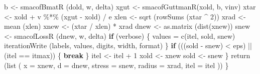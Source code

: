 \documentclass[
  12pt,
]{book}
\newenvironment{Shaded}{\begin{snugshade}}{\end{snugshade}}
\newcommand{\AttributeTok}[1]{\textcolor[rgb]{0.77,0.63,0.00}{#1}}
\newcommand{\ControlFlowTok}[1]{\textcolor[rgb]{0.13,0.29,0.53}{\textbf{#1}}}
\newcommand{\DecValTok}[1]{\textcolor[rgb]{0.00,0.00,0.81}{#1}}
\newcommand{\FunctionTok}[1]{\textcolor[rgb]{0.00,0.00,0.00}{#1}}
\newcommand{\NormalTok}[1]{#1}
\newcommand{\OtherTok}[1]{\textcolor[rgb]{0.56,0.35,0.01}{#1}}
\newcommand{\SpecialCharTok}[1]{\textcolor[rgb]{0.00,0.00,0.00}{#1}}
\theoremstyle{definition}
\theoremstyle{definition}
\theoremstyle{definition}
\theoremstyle{definition}
\theoremstyle{remark}
\begin{document}
\begin{Shaded}
\begin{Highlighting}[]
\NormalTok{      b }\OtherTok{\textless{}{-}} \FunctionTok{smacofBmatR}\NormalTok{ (dold, w, delta)}
\NormalTok{      xgut }\OtherTok{\textless{}{-}} \FunctionTok{smacofGuttmanR}\NormalTok{(xold, b, vinv)}
\NormalTok{      xtar }\OtherTok{\textless{}{-}}\NormalTok{ xold }\SpecialCharTok{+}\NormalTok{ v }\SpecialCharTok{\%*\%}\NormalTok{ (xgut }\SpecialCharTok{{-}}\NormalTok{ xold) }\SpecialCharTok{/}\NormalTok{ e}
\NormalTok{      xlen }\OtherTok{\textless{}{-}} \FunctionTok{sqrt}\NormalTok{ (}\FunctionTok{rowSums}\NormalTok{ (xtar }\SpecialCharTok{\^{}} \DecValTok{2}\NormalTok{))}
\NormalTok{      xrad }\OtherTok{\textless{}{-}} \FunctionTok{mean}\NormalTok{ (xlen)}
\NormalTok{      xnew }\OtherTok{\textless{}{-}}\NormalTok{ (xtar }\SpecialCharTok{/}\NormalTok{ xlen) }\SpecialCharTok{*}\NormalTok{ xrad}
\NormalTok{      dnew }\OtherTok{\textless{}{-}} \FunctionTok{as.matrix}\NormalTok{ (}\FunctionTok{dist}\NormalTok{(xnew))}
\NormalTok{      snew }\OtherTok{\textless{}{-}} \FunctionTok{smacofLossR}\NormalTok{ (dnew, w, delta)}
        \ControlFlowTok{if}\NormalTok{ (verbose) \{}
\NormalTok{          values }\OtherTok{=} \FunctionTok{c}\NormalTok{(itel, sold, snew)}
          \FunctionTok{iterationWrite}\NormalTok{ (labels, values, digits, width, format)}
\NormalTok{        \}}
        \ControlFlowTok{if}\NormalTok{ (((sold }\SpecialCharTok{{-}}\NormalTok{ snew) }\SpecialCharTok{\textless{}}\NormalTok{ eps) }\SpecialCharTok{||}\NormalTok{ (itel }\SpecialCharTok{==}\NormalTok{ itmax)) \{}
          \ControlFlowTok{break}
\NormalTok{        \}}
\NormalTok{        itel }\OtherTok{\textless{}{-}}\NormalTok{ itel }\SpecialCharTok{+} \DecValTok{1}
\NormalTok{        xold }\OtherTok{\textless{}{-}}\NormalTok{ xnew}
\NormalTok{        sold }\OtherTok{\textless{}{-}}\NormalTok{ snew}
\NormalTok{      \}}
      \FunctionTok{return}\NormalTok{ (}\FunctionTok{list}\NormalTok{ (}
        \AttributeTok{x =}\NormalTok{ xnew,}
        \AttributeTok{d =}\NormalTok{ dnew,}
        \AttributeTok{stress =}\NormalTok{ snew,}
        \AttributeTok{radius =}\NormalTok{ xrad,}
        \AttributeTok{itel =}\NormalTok{ itel}
\NormalTok{      ))}
\NormalTok{  \}}



\end{Highlighting}
\end{Shaded}
\end{document}
